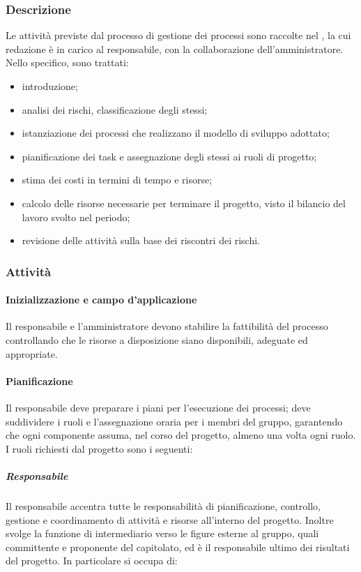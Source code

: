 	\subsubsection{Descrizione}
		Le attività previste dal processo di gestione dei processi sono raccolte nel , la cui redazione è in carico al responsabile, con la collaborazione dell'amministratore.
		\newline
		Nello specifico, sono trattati:

		\begin{itemize}
			\item introduzione;
			\item analisi dei rischi, classificazione degli stessi;
			\item istanziazione dei processi che realizzano il modello di sviluppo adottato;
			\item pianificazione dei task e assegnazione degli stessi ai ruoli di progetto;
			\item stima dei costi in termini di tempo e risorse;
			\item calcolo delle risorse necessarie per terminare il progetto, visto il bilancio del lavoro svolto nel periodo;
			\item revisione delle attività sulla base dei riscontri dei rischi.
		\end{itemize}
	\subsubsection{Attività}
		\paragraph{Inizializzazione e campo d'applicazione}
			Il responsabile e l'amministratore devono stabilire la fattibilità del processo controllando che le risorse a disposizione siano disponibili, adeguate ed appropriate. 
		\paragraph{Pianificazione}
			Il responsabile deve preparare i piani per l'esecuzione dei processi; deve suddividere i ruoli e l'assegnazione oraria per i membri del gruppo, garantendo che ogni componente assuma, nel corso del progetto, almeno una volta ogni ruolo.
			I ruoli richiesti dal progetto sono i seguenti:

		\subparagraph{Responsabile}

			Il responsabile accentra tutte le responsabilità di pianificazione, controllo, gestione e coordinamento di attività e risorse all'interno del progetto. Inoltre svolge la funzione di intermediario verso le figure esterne al gruppo, quali committente e proponente del capitolato, ed è il responsabile ultimo dei risultati del progetto.
			\newline
			In particolare si occupa di:

